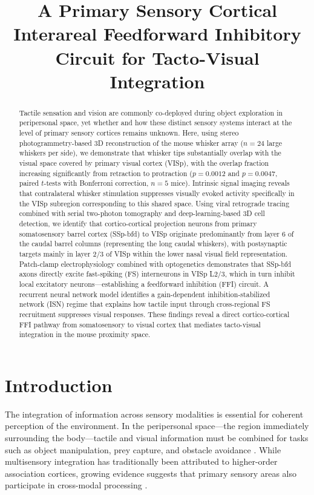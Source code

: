 \documentclass[11pt]{article}
\title{A Primary Sensory Cortical Interareal Feedforward Inhibitory Circuit for Tacto-Visual Integration}
\author{}
\date{}
\begin{document}
\maketitle

\begin{abstract}
Tactile sensation and vision are commonly co-deployed during object exploration in peripersonal space, yet whether and how these distinct sensory systems interact at the level of primary sensory cortices remains unknown. Here, using stereo photogrammetry-based 3D reconstruction of the mouse whisker array ($n = 24$ large whiskers per side), we demonstrate that whisker tips substantially overlap with the visual space covered by primary visual cortex (VISp), with the overlap fraction increasing significantly from retraction to protraction ($p = 0.0012$ and $p = 0.0047$, paired $t$-tests with Bonferroni correction, $n = 5$ mice). Intrinsic signal imaging reveals that contralateral whisker stimulation suppresses visually evoked activity specifically in the VISp subregion corresponding to this shared space. Using viral retrograde tracing combined with serial two-photon tomography and deep-learning-based 3D cell detection, we identify that cortico-cortical projection neurons from primary somatosensory barrel cortex (SSp-bfd) to VISp originate predominantly from layer 6 of the caudal barrel columns (representing the long caudal whiskers), with postsynaptic targets mainly in layer 2/3 of VISp within the lower nasal visual field representation. Patch-clamp electrophysiology combined with optogenetics demonstrates that SSp-bfd axons directly excite fast-spiking (FS) interneurons in VISp L2/3, which in turn inhibit local excitatory neurons---establishing a feedforward inhibition (FFI) circuit. A recurrent neural network model identifies a gain-dependent inhibition-stabilized network (ISN) regime that explains how tactile input through cross-regional FS recruitment suppresses visual responses. These findings reveal a direct cortico-cortical FFI pathway from somatosensory to visual cortex that mediates tacto-visual integration in the mouse proximity space.
\end{abstract}

\section{Introduction}

The integration of information across sensory modalities is essential for coherent perception of the environment. In the peripersonal space---the region immediately surrounding the body---tactile and visual information must be combined for tasks such as object manipulation, prey capture, and obstacle avoidance \citep{stein2012new}. While multisensory integration has traditionally been attributed to higher-order association cortices, growing evidence suggests that primary sensory areas also participate in cross-modal processing \citep{ghazanfar2006multisensory, iurilli2012sound, ibrahim2016cross}.
\end{document}

